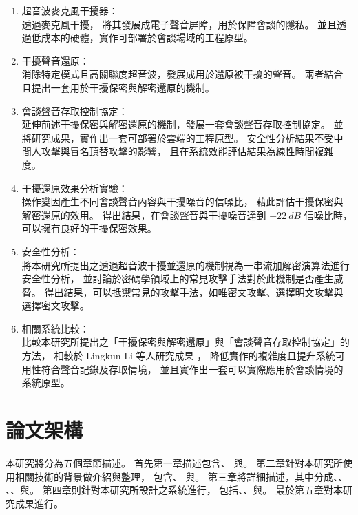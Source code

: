     \begin{enumerate}
        \item 超音波麥克風干擾器：\\
            透過麥克風干擾\cite{chen2020wearable}\cite{roy2017backdoor}，
        將其發展成電子聲音屏障，用於保障會談的隱私。
        並且透過低成本的硬體，實作可部署於會談場域的工程原型。

        \item 干擾聲音還原：\\
            消除特定模式且高關聯度超音波\cite{he2019canceling}，發展成用於還原被干擾的聲音。
        兩者結合且提出一套用於干擾保密與解密還原的機制。

        \item 會談聲音存取控制協定：\\
            延伸前述干擾保密與解密還原的機制，發展一套會談聲音存取控制協定。
        並將研究成果，實作出一套可部署於雲端的工程原型。
        安全性分析結果不受中間人攻擊與冒名頂替攻擊的影響，
        且在系統效能評估結果為線性時間複雜度。

        \item 干擾還原效果分析實驗：\\
            操作變因產生不同會談聲音內容與干擾噪音的信噪比，
        藉此評估干擾保密與解密還原的效用。
        得出結果，在會談聲音與干擾噪音達到 $-22~dB$ 信噪比時，可以擁有良好的干擾保密效果。

        \item 安全性分析：\\
            將本研究所提出之透過超音波干擾並還原的機制視為一串流加解密演算法進行安全性分析，
        並討論於密碼學領域上的常見攻擊手法對於此機制是否產生威脅。
        得出結果，可以抵禦常見的攻擊手法，如唯密文攻擊、選擇明文攻擊與選擇密文攻擊。

        \item 相關系統比較：\\
            比較本研究所提出之「干擾保密與解密還原」與「會談聲音存取控制協定」的方法，
        相較於 Lingkun Li 等人研究成果 \cite{li2020patronus}，
        降低實作的複雜度且提升系統可用性符合聲音記錄及存取情境，
        並且實作出一套可以實際應用於會談情境的系統原型。
    \end{enumerate}


\section{論文架構}\label{section:intro-arch}

    本研究將分為五個章節描述。
首先第一章描述包含、
與。
第二章針對本研究所使用相關技術的背景做介紹與整理，
包含、
與。
第三章將詳細描述，其中分成、、
、、與。
第四章則針對本研究所設計之系統進行，
包括、、與。
最於第五章對本研究成果進行。